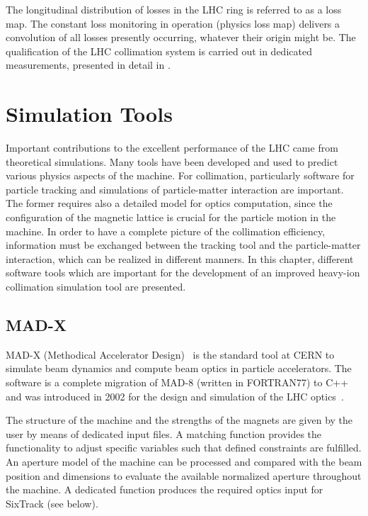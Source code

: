 The longitudinal distribution of losses in the LHC ring is referred to as a loss map. The constant loss monitoring in operation (physics loss map) delivers a convolution of all losses presently occurring, whatever their origin might be. The qualification of the LHC collimation system is carried out in dedicated measurements, presented in detail in .
%



\chapter{Simulation Tools} \label{chap:simtools}

Important contributions to the excellent performance of the LHC came from theoretical simulations. Many tools have been developed and used to predict various physics aspects of the machine. For collimation, particularly software for particle tracking and simulations of particle-matter interaction are important. The former requires also a detailed model for optics computation, since the configuration of the magnetic lattice is crucial for the particle motion in the machine. In order to have a complete picture of the collimation efficiency, information must be exchanged between the tracking tool and the particle-matter interaction, which can be realized in different manners. In this chapter, different software tools which are important for the development of an improved heavy-ion collimation simulation tool are presented.



\section{MAD-X}
MAD-X (Methodical Accelerator Design)~\cite{MADXref01} is the standard tool at CERN to simulate beam dynamics and compute beam optics in particle accelerators. The software is a complete migration of MAD-8 (written in FORTRAN77) to C++ and was introduced in 2002 for the design and simulation of the LHC optics~\cite{MADXref02}.

The structure of the machine and the strengths of the magnets are given by the user by means of dedicated input files. A matching function provides the functionality to adjust specific variables such that  defined constraints are fulfilled. An aperture model of the machine can be processed and compared with the beam position and dimensions to evaluate the available normalized aperture throughout the machine. A dedicated function produces the required optics input for SixTrack (see below). 



